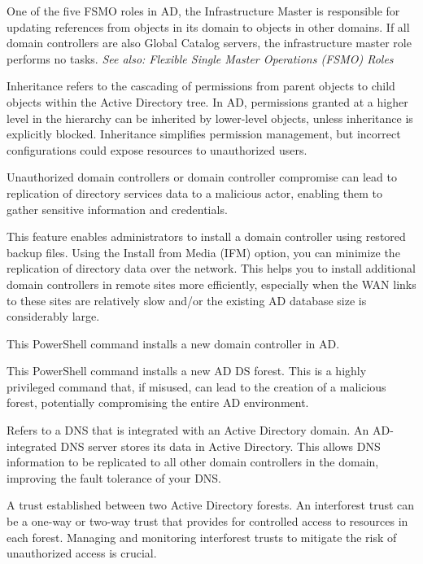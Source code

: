  One of the five FSMO roles in AD, the Infrastructure Master is responsible for updating references from objects in its domain to objects in other domains. If all domain controllers are also Global Catalog servers, the infrastructure master role performs no tasks.
\textit{See also: Flexible Single Master Operations (FSMO) Roles}

 Inheritance refers to the cascading of permissions from parent objects to child objects within the Active Directory tree. In AD, permissions granted at a higher level in the hierarchy can be inherited by lower-level objects, unless inheritance is explicitly blocked. Inheritance simplifies permission management, but incorrect configurations could expose resources to unauthorized users. 

 Unauthorized domain controllers or domain controller compromise can lead to replication of directory services data to a malicious actor, enabling them to gather sensitive information and credentials.

 This feature enables administrators to install a domain controller using restored backup files. Using the Install from Media (IFM) option, you can minimize the replication of directory data over the network. This helps you to install additional domain controllers in remote sites more efficiently, especially when the WAN links to these sites are relatively slow and/or the existing AD database size is considerably large.

 This PowerShell command installs a new domain controller in AD.

 This PowerShell command installs a new AD DS forest. This is a highly privileged command that, if misused, can lead to the creation of a malicious forest, potentially compromising the entire AD environment.

 Refers to a DNS that is integrated with an Active Directory domain. An AD-integrated DNS server stores its data in Active Directory. This allows DNS information to be replicated to all other domain controllers in the domain, improving the fault tolerance of your DNS.

 A trust established between two Active Directory forests. An interforest trust can be a one-way or two-way trust that provides for controlled access to resources in each forest. Managing and monitoring interforest trusts to mitigate the risk of unauthorized access is crucial.

